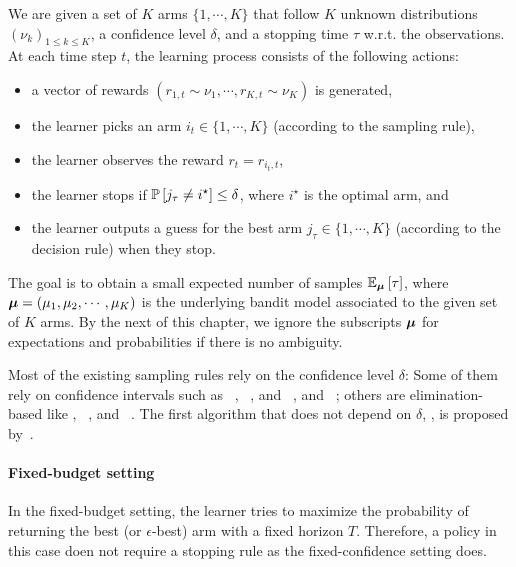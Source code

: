 \begin{definition}\label{def:bai_confidence}
\begin{leftbar}[defnbar]
	We are given a set of $K$ arms $\{1,\cdots,K\}$ that follow $K$ unknown distributions $(\nu_k)_{1 \leq k \leq K}$, a confidence level $\delta$, and a stopping time $\tau$ w.r.t. the observations. At each time step $t$, the learning process consists of the following actions:
\begin{itemize}
	\item a vector of rewards $(r_{1,t} \sim \nu_1, \cdots, r_{K,t} \sim \nu_K)$ is generated,
	\item the learner picks an arm $i_t \in \{1,\cdots,K\}$ (according to the sampling rule),
	\item the learner observes the reward $r_t = r_{i_t, t}$,
	\item the learner stops if $\mathbb{P}\left[j_{\tau}\neq i^{\star}\right] \leq \delta$, where $i^{\star}$ is the optimal arm, and
	\item the learner outputs a guess for the best arm $j_\tau \in \{1,\cdots,K\}$ (according to the decision rule) when they stop.
\end{itemize}
\end{leftbar}
\end{definition}

The goal is to obtain a small expected number of samples $\mathbb{E}_{{\boldsymbol \mu}}\left[\tau\right]$, where ${\boldsymbol \mu}=(\mu_1,\mu_2,\cdots,\mu_K)$ is the underlying bandit model associated to the given set of $K$ arms. By the next of this chapter, we ignore the subscripts ${\boldsymbol \mu}$ for expectations and probabilities if there is no ambiguity. 

Most of the existing sampling rules rely on the confidence level $\delta$: Some of them rely on confidence intervals such as \LUCB~\citep{kalyanakrishnan2012lucb}, \UGapE~\citep{gabillon2012ugape}, \KLLUCB and \KLRacing~\citep{kaufmann2013kl}, and \LIL~\citep{jamieson2014lilucb}; others are elimination-based like \SE, \ME~\citep{even-dar2003confidence}, and \EGE~\citep{karnin2013sha}. The first algorithm that does not depend on $\delta$, \Track, is proposed by~\cite{garivier2016tracknstop}.

\paragraph{Fixed-budget setting}

In the fixed-budget setting, the learner tries to maximize the probability of returning the best (or $\epsilon$-best) arm with a fixed horizon $T$. Therefore, a policy in this case doen not require a stopping rule as the fixed-confidence setting does.

